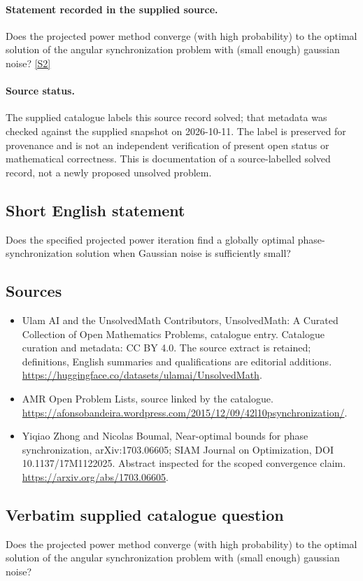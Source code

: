 \documentclass[11pt]{article}
\begin{document}
\paragraph{Statement recorded in the supplied source.}
Does the projected power method converge (with high probability) to the optimal solution of the angular synchronization problem with (small enough) gaussian noise? \href{https://afonsobandeira.wordpress.com/2015/12/09/42l10psynchronization/}{[S2]}
\paragraph{Source status.}
The supplied catalogue labels this source record solved; that metadata was checked against the supplied snapshot on 2026-10-11. The label is preserved for provenance and is not an independent verification of present open status or mathematical correctness. This is documentation of a source-labelled solved record, not a newly proposed unsolved problem.
\subsection{Short English statement}
Does the specified projected power iteration find a globally optimal phase-synchronization solution when Gaussian noise is sufficiently small?
\subsection{Sources}
\begin{itemize}
\item[S1] Ulam AI and the UnsolvedMath Contributors, UnsolvedMath: A Curated Collection of Open Mathematics Problems, catalogue entry. Catalogue curation and metadata: CC BY 4.0. The source extract is retained; definitions, English summaries and qualifications are editorial additions.
\url{https://huggingface.co/datasets/ulamai/UnsolvedMath}.
\item[S2] AMR Open Problem Lists, source linked by the catalogue.
\url{https://afonsobandeira.wordpress.com/2015/12/09/42l10psynchronization/}.
\item[S3] Yiqiao Zhong and Nicolas Boumal, Near-optimal bounds for phase synchronization, arXiv:1703.06605; SIAM Journal on Optimization, DOI 10.1137/17M1122025. Abstract inspected for the scoped convergence claim.
\url{https://arxiv.org/abs/1703.06605}.
\end{itemize}
\subsection{Verbatim supplied catalogue question}
Does the projected power method converge (with high probability) to the optimal solution of the angular synchronization problem with (small enough) gaussian noise?
\end{document}
